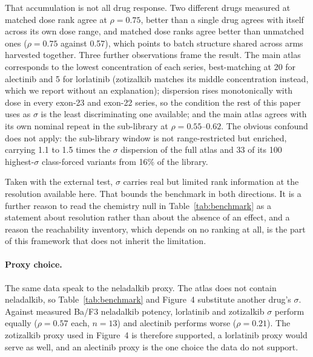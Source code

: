 \documentclass[11pt,a4paper]{article}
\begin{document}
That accumulation is not all drug response. Two different drugs
measured at matched dose rank agree at $\rho = 0.75$, better than a
single drug agrees with itself across its own dose range, and matched
dose ranks agree better than unmatched ones ($\rho = 0.75$ against
0.57), which points to batch structure shared across arms harvested
together. Three further observations frame the result. The main atlas
corresponds to the lowest concentration of each series, best-matching
at 20 for alectinib and 5 for lorlatinib (zotizalkib matches its middle
concentration instead, which we report without an explanation);
dispersion rises monotonically with dose in every exon-23 and exon-22
series, so the condition the rest of this paper uses as $\sigma$ is the
least discriminating one available; and the main atlas agrees with its
own nominal repeat in the sub-library at $\rho = 0.55$--$0.62$. The
obvious confound does not apply: the sub-library window is not
range-restricted but enriched, carrying 1.1 to 1.5 times the $\sigma$
dispersion of the full atlas and 33 of its 100 highest-$\sigma$
class-forced variants from 16\% of the library.

Taken with the external test, $\sigma$ carries real but limited rank
information at the resolution available here. That bounds the benchmark
in both directions. It is a further reason to read the chemistry null
in Table~\ref{tab:benchmark} as a statement about resolution rather
than about the absence of an effect, and a reason the reachability
inventory, which depends on no ranking at all, is the part of this
framework that does not inherit the limitation.

\paragraph{Proxy choice.}
The same data speak to the neladalkib proxy. The atlas does not contain
neladalkib, so Table~\ref{tab:benchmark} and Figure~4 substitute another
drug's $\sigma$. Against measured Ba/F3 neladalkib potency, lorlatinib
and zotizalkib $\sigma$ perform equally ($\rho = 0.57$ each, $n = 13$)
and alectinib performs worse ($\rho = 0.21$). The zotizalkib proxy used
in Figure~4 is therefore supported, a lorlatinib proxy would serve as
well, and an alectinib proxy is the one choice the data do not support.
\end{document}
